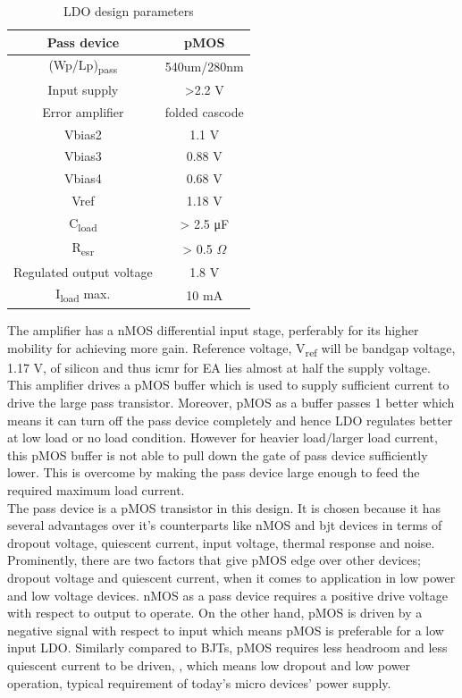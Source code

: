 \documentclass[12pt,a4paper,UKenglish]{report}
\begin{document}
\begin{table}[H]
\caption{LDO design parameters}
\begin{center}
\begin{tabular}{c|c}
\hline \hline
Pass device				& pMOS \\ \hline
(Wp/Lp)\textsubscript{pass} 	& 540um/280nm \\ \hline
Input supply 				& >2.2 V \\ \hline
Error amplifier				& folded cascode \\ \hline
Vbias2 					& 1.1 V \\ \hline
Vbias3					& 0.88 V \\ \hline
Vbias4					& 0.68 V \\ \hline
Vref						& 1.18 V \\ \hline
C\textsubscript{load} 		& > 2.5 \si{\micro\farad}  \\ \hline
R\textsubscript{esr} 	 		& > 0.5 $\Omega$ \\ \hline
Regulated output voltage 		& 1.8 V \\ \hline
I\textsubscript{load} max. 		& 10 mA \\
\hline \hline
\end{tabular}
\end{center}
\label{tab:ldo_parameter}
\end{table}

The amplifier has a nMOS differential input stage, perferably for its higher mobility for achieving more gain.
Reference voltage, V\textsubscript{ref} will be bandgap voltage, 1.17 V, of silicon and  thus \acrshort{icmr} 
for EA lies almost at half the supply voltage. This amplifier drives a pMOS buffer which is used to supply 
sufficient current to drive the large pass transistor. Moreover, pMOS as a buffer passes 1 better which means 
it can turn off the pass device completely and hence LDO regulates better at low load or no load condition. 
However for heavier load/larger load current, this pMOS buffer is not able to pull down the gate of pass device 
sufficiently lower. This is overcome by making the pass device large enough to feed the required  maximum 
load current.\\

The pass device is a pMOS transistor in this design. It is chosen because it has several advantages over it's 
counterparts like nMOS and \acrshort{bjt} devices in terms of dropout voltage, quiescent current, input voltage, thermal 
response and noise\cite{ldo_ti_pmos}. Prominently, there are two factors that give pMOS edge over other devices; 
dropout voltage and quiescent current, when it comes to application in low power and low voltage devices. nMOS as 
a pass device requires a positive drive voltage with respect to output to operate. On the other hand, pMOS is 
driven by a negative signal with respect to input which means pMOS is preferable for a low input LDO. Similarly 
compared to BJTs, pMOS requires less headroom and less quiescent current to be driven\cite{ldo_ti_pmos}, 
\cite{ldo_ti_stability}, which means low dropout and low power operation, typical requirement of today's micro 
devices' power supply. \\
\end{document}
